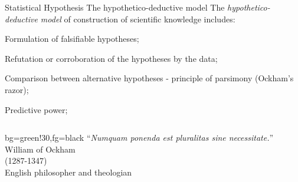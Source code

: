 \documentclass[t]{beamer}
\begin{document}
\begin{ftst}
{Statistical Hypothesis}
{The hypothetico-deductive model}
The \textit{hypothetico-deductive model} of construction of scientific knowledge includes:

\bitems Formulation of falsifiable hypotheses;
	\item Refutation or corroboration of the hypotheses by the data;
	\item Comparison between alternative hypotheses - principle of parsimony (Ockham's razor);
	\item Predictive power;
\eitem

\begin{columns}[T]
    \vhalf
	\begin{colorblock}{}{bg=green!30,fg=black}
	``\textit{Numquam ponenda est pluralitas sine necessitate.}''\\
	\flushright\vspace{-1em}\small William of Ockham\\
	\flushright\vspace{-1em}\small (1287-1347)\\
	\flushright\vspace{-1em}\small English philosopher and theologian\\
	\end{colorblock}
\end{columns}
\end{ftst}


\end{document}
